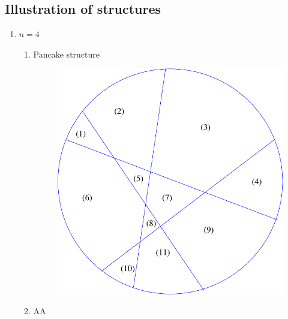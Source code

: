 \documentclass[a4paper,10pt]{article}
\begin{document}
\iffalse\subsection{Illustration of structures }
\begin{enumerate}
  \item $n = 4$\\


  	\begin{enumerate}
    	\item Pancake structure\\
    	\begin{figure}[h!]
			\includegraphics[scale=0.3]{graphics/pancakecut11}
			\captionsetup{labelformat=empty}
			\caption{}
			\label{fig:pancakecut11}
		\end{figure}
   
    \item AA\\
    

\end{enumerate}
\end{enumerate}
\end{document}
